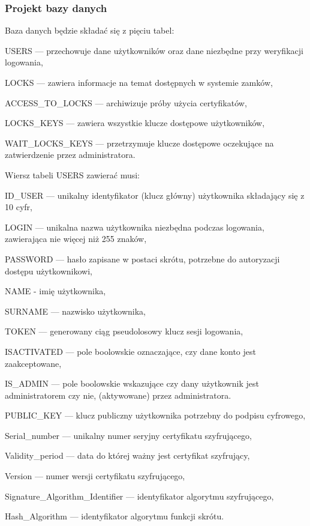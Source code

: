 	\subsubsection{Projekt bazy danych} 
	Baza danych\cite{BD} będzie składać się z pięciu tabel:
	\begin{itemize*}
		\item {USERS} --- przechowuje dane użytkowników oraz dane niezbędne przy weryfikacji logowania,
		\item {LOCKS} --- zawiera informacje na temat dostępnych w systemie zamków,
		\item {ACCESS\_TO\_LOCKS} --- archiwizuje próby użycia certyfikatów,
		\item {LOCKS\_KEYS} --- zawiera wszystkie klucze dostępowe użytkowników,
		\item {WAIT\_LOCKS\_KEYS} --- przetrzymuje klucze dostępowe oczekujące na zatwierdzenie przez administratora.
	\end{itemize*}
	
	Wiersz tabeli USERS zawierać musi:
	\begin{itemize*}
		\item {ID\_USER} --- unikalny identyfikator (klucz główny) użytkownika składający się z 10 cyfr,
		\item {LOGIN} --- unikalna nazwa użytkownika niezbędna podczas logowania, zawierająca nie więcej niż 255 znaków,
		\item {PASSWORD} --- hasło zapisane w postaci skrótu, potrzebne do autoryzacji dostępu użytkownikowi,
		\item {NAME} - imię użytkownika,
		\item {SURNAME} --- nazwisko użytkownika,
		\item {TOKEN} --- generowany ciąg pseudolosowy klucz sesji logowania,
		\item  {ISACTIVATED} --- pole boolowskie oznaczające, czy dane konto jest zaakceptowane,
		\item {IS\_ADMIN} --- pole boolowskie wskazujące czy dany użytkownik jest administratorem czy nie, (aktywowane) przez administratora.
		\item {PUBLIC\_KEY} --- klucz publiczny użytkownika potrzebny do podpisu cyfrowego,
		\item Serial\_number --- unikalny numer seryjny certyfikatu szyfrującego,
		\item Validity\_period --- data do której ważny jest certyfikat szyfrujący,
		\item Version --- numer wersji certyfikatu szyfrującego,
		\item Signature\_Algorithm\_Identifier --- identyfikator algorytmu szyfrującego,
		\item Hash\_Algorithm --- identyfikator algorytmu funkcji skrótu.
	\end{itemize*}
	
